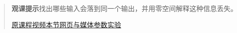 \begin{quote}\small\textbf{观课提示}\quad 找出哪些输入会落到同一个输出，并用零空间解释这种信息丢失。

\href{https://www.youtube.com/watch?v=uQhTuRlWMxw}{原课程视频}\quad\href{https://vitael04213.github.io/3blue1brown-notes/lessons/inverse-matrices.html}{本节网页与媒体}\quad\href{https://vitael04213.github.io/3blue1brown-notes/lab.html\#linear}{参数实验}
\end{quote}
